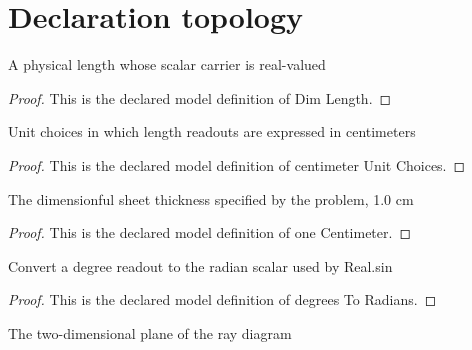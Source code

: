 \section{Declaration topology}
\begin{definition}
  \label{def:physics:phyx-mini-0049:phyxminiproblems-problemphyxmini0049-dimlength}
  A physical length whose scalar carrier is real-valued
\end{definition}
\begin{proof}
  This is the declared model definition of Dim Length.
\end{proof}
\begin{definition}
  \label{def:physics:phyx-mini-0049:phyxminiproblems-problemphyxmini0049-centimeterunitchoices}
  Unit choices in which length readouts are expressed in centimeters
\end{definition}
\begin{proof}
  This is the declared model definition of centimeter Unit Choices.
\end{proof}
\begin{definition}
  \label{def:physics:phyx-mini-0049:phyxminiproblems-problemphyxmini0049-onecentimeter}
  The dimensionful sheet thickness specified by the problem, 1.0 cm
\end{definition}
\begin{proof}
  This is the declared model definition of one Centimeter.
\end{proof}
\begin{definition}
  \label{def:physics:phyx-mini-0049:phyxminiproblems-problemphyxmini0049-degreestoradians}
  Convert a degree readout to the radian scalar used by Real.sin
\end{definition}
\begin{proof}
  This is the declared model definition of degrees To Radians.
\end{proof}
\begin{definition}
  \label{def:physics:phyx-mini-0049:phyxminiproblems-problemphyxmini0049-diagramplane}
  The two-dimensional plane of the ray diagram
\end{definition}
